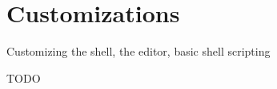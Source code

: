 \chapter{Customizations}

\begin{chapsummary}
Customizing the shell, the editor, basic shell scripting
\end{chapsummary}

TODO
